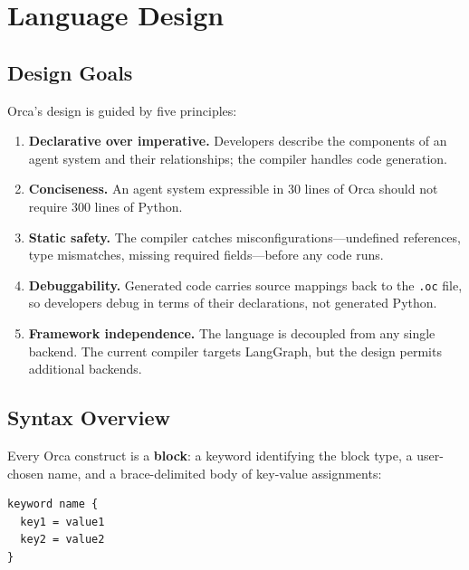 \documentclass[sigconf,nonacm]{acmart}
\begin{document}
\section{Language Design}
\label{sec:language}

\subsection{Design Goals}
\label{sec:language:goals}

Orca's design is guided by five principles:

\begin{enumerate}[leftmargin=*]
  \item \textbf{Declarative over imperative.} Developers describe the
        components of an agent system and their relationships; the compiler
        handles code generation.
  \item \textbf{Conciseness.} An agent system expressible in 30 lines of
        Orca should not require 300 lines of Python.
  \item \textbf{Static safety.} The compiler catches misconfigurations---undefined
        references, type mismatches, missing required fields---before any
        code runs.
  \item \textbf{Debuggability.} Generated code carries source mappings back
        to the \texttt{.oc} file, so developers debug in terms of their
        declarations, not generated Python.
  \item \textbf{Framework independence.} The language is decoupled from any
        single backend. The current compiler targets LangGraph, but the
        design permits additional backends.
\end{enumerate}

\subsection{Syntax Overview}
\label{sec:language:syntax}

Every Orca construct is a \textbf{block}: a keyword identifying the block
type, a user-chosen name, and a brace-delimited body of key-value
assignments:

\begin{lstlisting}
keyword name {
  key1 = value1
  key2 = value2
}
\end{lstlisting}
\end{document}
